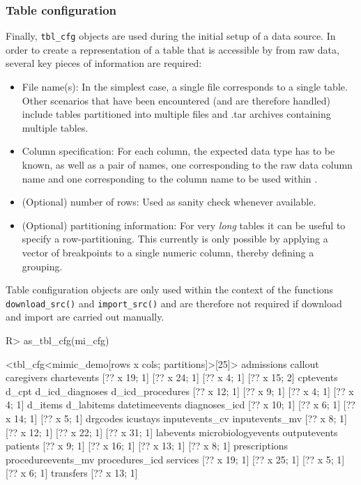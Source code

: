 \documentclass[
  notitle,
  nojss,
  noheadings]{jss}
\begin{document}
\hypertarget{table-configuration}{%
\subsubsection{Table configuration}\label{table-configuration}}

Finally, \texttt{tbl\_cfg} objects are used during the initial setup of
a data source. In order to create a representation of a table that is
accessible by  from raw data, several key pieces of
information are required:

\begin{itemize}
\item
  File name(s): In the simplest case, a single file corresponds to a
  single table. Other scenarios that have been encountered (and are
  therefore handled) include tables partitioned into multiple files and
  .tar archives containing multiple tables.
\item
  Column specification: For each column, the expected data type has to
  be known, as well as a pair of names, one corresponding to the raw
  data column name and one corresponding to the column name to be used
  within .
\item
  (Optional) number of rows: Used as sanity check whenever available.
\item
  (Optional) partitioning information: For very \emph{long} tables it
  can be useful to specify a row-partitioning. This currently is only
  possible by applying a vector of breakpoints to a single numeric
  column, thereby defining a grouping.
\end{itemize}

Table configuration objects are only used within the context of the
functions \texttt{download\_src()} and \texttt{import\_src()} and are
therefore not required if download and import are carried out manually.

\begin{CodeChunk}
\begin{CodeInput}
R> as_tbl_cfg(mi_cfg)
\end{CodeInput}
\begin{CodeOutput}
<tbl_cfg<mimic_demo[rows x cols; partitions]>[25]>
        admissions            callout         caregivers        chartevents 
      [?? x 19; 1]       [?? x 24; 1]        [?? x 4; 1]       [?? x 15; 2] 
         cptevents              d_cpt    d_icd_diagnoses   d_icd_procedures 
      [?? x 12; 1]        [?? x 9; 1]        [?? x 4; 1]        [?? x 4; 1] 
           d_items         d_labitems     datetimeevents      diagnoses_icd 
      [?? x 10; 1]        [?? x 6; 1]       [?? x 14; 1]        [?? x 5; 1] 
          drgcodes           icustays     inputevents_cv     inputevents_mv 
       [?? x 8; 1]       [?? x 12; 1]       [?? x 22; 1]       [?? x 31; 1] 
         labevents microbiologyevents       outputevents           patients 
       [?? x 9; 1]       [?? x 16; 1]       [?? x 13; 1]        [?? x 8; 1] 
     prescriptions procedureevents_mv     procedures_icd           services 
      [?? x 19; 1]       [?? x 25; 1]        [?? x 5; 1]        [?? x 6; 1] 
         transfers 
      [?? x 13; 1] 
\end{CodeOutput}
\end{CodeChunk}
\end{document}
